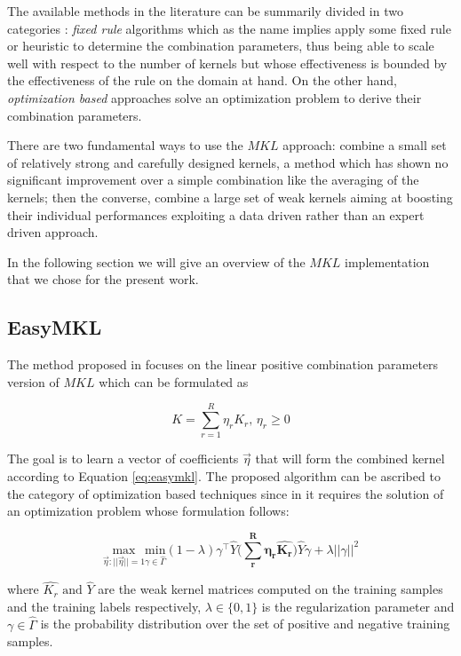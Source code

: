 The available methods in the literature can be summarily divided in two categories
\cite{journals/jmlr/GonenA11}: \emph{fixed rule} algorithms which as the name implies apply some fixed
rule or heuristic to determine the combination parameters, thus being able to scale
well with respect to the number of kernels but whose effectiveness is bounded by
the effectiveness of the rule on the domain at hand.
On the other hand, \emph{optimization based} approaches solve an optimization
problem to derive their combination parameters.

There are two fundamental ways to use the $MKL$ approach: combine a small set of 
relatively strong and carefully designed kernels, a method which has shown no
significant improvement over a simple combination like the averaging of the kernels;
then the converse, combine a large set of weak kernels aiming at boosting their
individual performances exploiting a data driven rather than an expert driven
approach.

In the following section we will give an overview of the $MKL$ implementation
that we chose for the present work.

\subsection{EasyMKL}
\label{subsec:easymkl}

The method proposed in \cite{aiolli2015easymkl} focuses on the linear positive combination
parameters version of $MKL$ which can be formulated as

\begin{equation}
    K = \sum_{r=1}^R \eta_rK_r,\, \eta_r \geq 0
    \label{eq:easymkl}
\end{equation}

The goal is to learn a vector of coefficients $\vec{\eta}$ that will form the
combined kernel according to Equation \ref{eq:easymkl}.
The proposed algorithm can be ascribed to the category of optimization based
techniques since in it requires the solution of an optimization problem whose
formulation follows:

\begin{equation}
    \underset{\vec{\eta}:||\vec{\eta}||=1}{\mathrm{max}}\underset{\gamma \in \hat{\Gamma}}{\mathrm{min}}(1-\lambda)\gamma^\top\hat{Y}\Big(\boldsymbol{\sum_r^R \eta_r\hat{K_r}}\Big)\hat{Y}\gamma+\lambda||\gamma||^2
    \label{eq:easymin}
\end{equation}

where $\hat{K_r}\text{ and }\hat{Y}$ are the weak kernel matrices computed on the training samples
and the training labels respectively, $\lambda \in \{0,1\}$ is the regularization
parameter and $\gamma \in \hat{\Gamma}$ is the probability distribution over the set of positive and
negative training samples.

